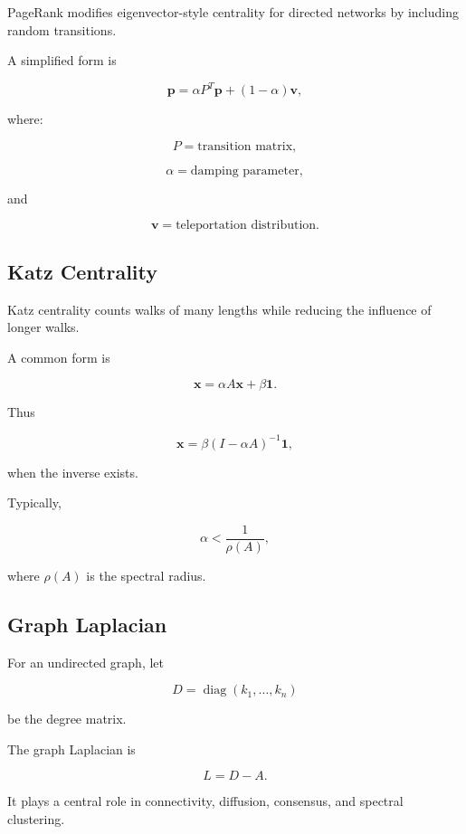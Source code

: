 PageRank modifies eigenvector-style centrality for directed networks by
including random transitions.

A simplified form is

\[
\boxed{
\mathbf{p}
=
\alpha P^T\mathbf{p}
+
(1-\alpha)\mathbf{v},
}
\]

where:

\[
P
=
\text{transition matrix},
\]

\[
\alpha
=
\text{damping parameter},
\]

and

\[
\mathbf{v}
=
\text{teleportation distribution}.
\]

\subsection{Katz Centrality}
\label{subsec:katz-centrality}

Katz centrality counts walks of many lengths while reducing the influence of
longer walks.

A common form is

\[
\boxed{
\mathbf{x}
=
\alpha A\mathbf{x}
+
\beta\mathbf{1}.
}
\]

Thus

\[
\boxed{
\mathbf{x}
=
\beta
(I-\alpha A)^{-1}\mathbf{1},
}
\]

when the inverse exists.

Typically,

\[
\alpha
<
\frac{1}{\rho(A)},
\]

where \(\rho(A)\) is the spectral radius.

\subsection{Graph Laplacian}
\label{subsec:graph-laplacian-network}

For an undirected graph, let

\[
D
=
\operatorname{diag}(k_1,\ldots,k_n)
\]

be the degree matrix.

The graph Laplacian is

\[
\boxed{
L
=
D-A.
}
\]

It plays a central role in connectivity, diffusion, consensus, and spectral
clustering.

